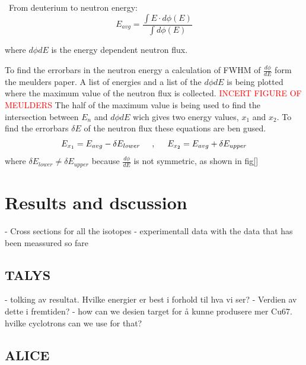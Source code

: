 \documentclass[twoside,english]{uiofysmaster/uiofysmaster}
\begin{document}
\
From deuterium to neutron energy:
\begin{equation}
E_{avg} = \frac{\int E \cdot d\phi(E)}{\int d\phi ( E)} 
\end{equation}


where $d\phi dE$  is the energy dependent neutron flux.


To find the errorbars in the neutron energy a calculation of FWHM of $\frac{d\phi}{dE}$ form the meulders paper\cite{Meulders}. A list of energies and a list of the $d\phi dE$ is being plotted where the maximum value of the neutron flux is collected. \textcolor{red}{INCERT FIGURE OF MEULDERS} The half of the maximum value is being used to find the intersection between $E_n$ and $d\phi dE$ wich gives two energy values, $x_1$ and $x_2$. To find the errorbars $\delta E$ of the neutron flux these equations are ben gused.
\begin{equation}
E_{x_1} = E_{avg} - \delta E_{lower}\hspace{.5cm} , \hspace{.5cm} E_{x_2} = E_{avg} + \delta E_{upper}
\end{equation}
where $\delta E_{lower} \neq \delta E_{upper}$ because $\frac{d\phi}{dE}$ is not symmetric, as shown in fig\ref{}


\chapter{Results and dscussion} 
\label{ch: res_and_discussion}
- Cross sections for all the isotopes
- experimentall data with the data that has been meassured so fare


\section{TALYS}
\label{sec: talys}


- tolking av resultat. Hvilke energier er best i forhold til hva vi ser?
- Verdien av dette i fremtiden?
- how can we  desien target for å kunne produsere mer Cu67. hvilke cyclotrons can we use for that? 

\section{ALICE}
\label{sec: alice}
\end{document}
